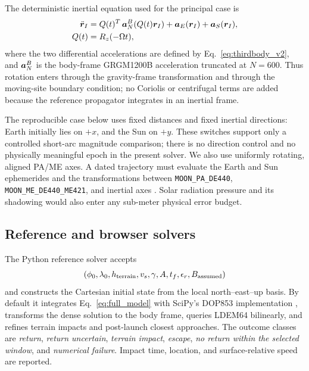 The deterministic inertial equation used for the principal case is
\begin{align}
 \ddot{\bm{r}}_I={}&Q(t)^{T}\,
 \bm{a}_{N}^{B}\!\left(Q(t)\bm{r}_I\right)
 +\bm{a}_E(\bm{r}_I)+\bm{a}_S(\bm{r}_I),
 \label{eq:full_model}\\
 Q(t)={}&R_z(-\Omega t),
\end{align}
where the two differential accelerations are defined by Eq.~\eqref{eq:thirdbody_v2}, and \(\bm{a}_N^B\) is the body-frame GRGM1200B acceleration truncated at \(N=600\). Thus rotation enters through the gravity-frame transformation and through the moving-site boundary condition; no Coriolis or centrifugal terms are added because the reference propagator integrates in an inertial frame.

The reproducible case below uses fixed distances and fixed inertial directions:
Earth initially lies on \(+x\), and the Sun on \(+y\). These switches support
only a controlled short-arc magnitude comparison; there is no direction
control and no physically meaningful epoch in the present solver. We also use
uniformly rotating, aligned PA/ME axes. A dated trajectory must evaluate
the Earth and Sun ephemerides and the transformations between
\texttt{MOON\_PA\_DE440}, \texttt{MOON\_ME\_DE440\_ME421}, and inertial axes
\cite{Park2021,Acton1996,NAIFLunarFrames}. Solar radiation pressure and its
shadowing would also enter any sub-meter physical error budget.

\subsection{Reference and browser solvers}

The Python reference solver accepts
\[
(\phi_0,\lambda_0,h_{\rm terrain},v_s,\gamma,A,t_f,
\epsilon_r,B_{\rm assumed})
\]
and constructs the Cartesian initial state from the local north--east--up basis. By default it integrates Eq.~\eqref{eq:full_model} with SciPy's DOP853 implementation \cite{Virtanen2020}, transforms the dense solution to the body frame, queries LDEM64 bilinearly, and refines terrain impacts and post-launch closest approaches. The outcome classes are \emph{return}, \emph{return uncertain}, \emph{terrain impact}, \emph{escape}, \emph{no return within the selected window}, and \emph{numerical failure}. Impact time, location, and surface-relative speed are reported.

